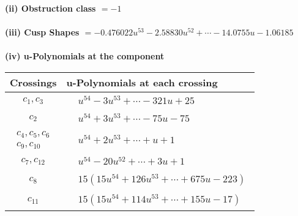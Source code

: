 \documentclass[1p]{elsarticle_modified}
\theoremstyle{definition}
\begin{document}
\flushleft \textbf{(ii) Obstruction class $= -1$}\\~\\
\flushleft \textbf{(iii) Cusp Shapes $= -0.476022 u^{53}-2.58830 u^{52}+\cdots-14.0755 u-1.06185$}\\~\\
\newpage\renewcommand{\arraystretch}{1}
\flushleft \textbf{(iv) u-Polynomials at the component}\newline \\
\begin{tabular}{m{50pt}|m{274pt}}
Crossings & \hspace{64pt}u-Polynomials at each crossing \\
\hline $$\begin{aligned}c_{1},c_{3}\end{aligned}$$&$\begin{aligned}
&u^{54}-3 u^{53}+\cdots-321 u+25
\end{aligned}$\\
\hline $$\begin{aligned}c_{2}\end{aligned}$$&$\begin{aligned}
&u^{54}+3 u^{53}+\cdots-75 u-75
\end{aligned}$\\
\hline $$\begin{aligned}c_{4},c_{5},c_{6}\\c_{9},c_{10}\end{aligned}$$&$\begin{aligned}
&u^{54}+2 u^{53}+\cdots+u+1
\end{aligned}$\\
\hline $$\begin{aligned}c_{7},c_{12}\end{aligned}$$&$\begin{aligned}
&u^{54}-20 u^{52}+\cdots+3 u+1
\end{aligned}$\\
\hline $$\begin{aligned}c_{8}\end{aligned}$$&$\begin{aligned}
&15(15 u^{54}+126 u^{53}+\cdots+675 u-223)
\end{aligned}$\\
\hline $$\begin{aligned}c_{11}\end{aligned}$$&$\begin{aligned}
&15(15 u^{54}+114 u^{53}+\cdots+155 u-17)
\end{aligned}$\\
\hline
\end{tabular}\\~\\
\end{document}

